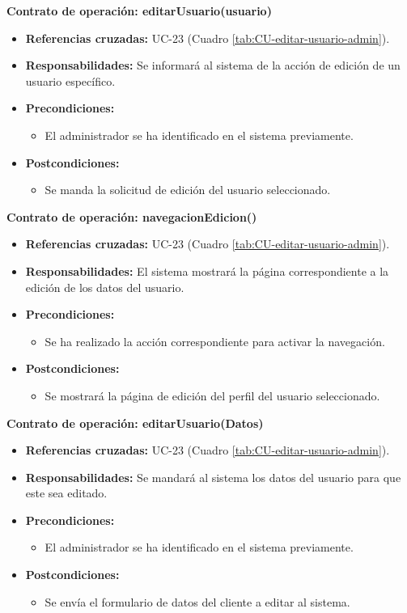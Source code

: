 \textbf{Contrato de operación: editarUsuario(usuario)}
\begin{itemize}
\item \textbf{Referencias cruzadas:} UC-23 (Cuadro \ref{tab:CU-editar-usuario-admin}).
\item \textbf{Responsabilidades:} Se informará al sistema de la acción de edición de un usuario específico.
\item \textbf{Precondiciones:} 
 \begin{itemize}
\item El administrador se ha identificado en el sistema previamente.
\end {itemize}
\item \textbf{Postcondiciones:} 
 \begin{itemize}
\item Se manda la solicitud de edición del usuario seleccionado.
\end {itemize}
\end {itemize}

\textbf{Contrato de operación: navegacionEdicion()}
\begin{itemize}
\item \textbf{Referencias cruzadas:} UC-23 (Cuadro \ref{tab:CU-editar-usuario-admin}).
\item \textbf{Responsabilidades:} El sistema mostrará la página correspondiente a la edición de los datos del usuario.
\item \textbf{Precondiciones:} 
 \begin{itemize}
\item Se ha realizado la acción correspondiente para activar la navegación.
\end {itemize}
\item \textbf{Postcondiciones:} 
 \begin{itemize}
\item Se mostrará la página de edición del perfil del usuario seleccionado.
\end {itemize}
\end {itemize}

\textbf{Contrato de operación: editarUsuario(Datos)}
\begin{itemize}
\item \textbf{Referencias cruzadas:} UC-23 (Cuadro \ref{tab:CU-editar-usuario-admin}).
\item \textbf{Responsabilidades:} Se mandará al sistema los datos del usuario para que este sea editado.
\item \textbf{Precondiciones:} 
 \begin{itemize}
\item El administrador se ha identificado en el sistema previamente.
\end {itemize}
\item \textbf{Postcondiciones:} 
 \begin{itemize}
\item Se envía el formulario de datos del cliente a editar al sistema.
\end {itemize}
\end {itemize}

